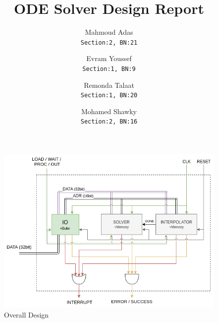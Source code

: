 \documentclass[12pt]{extarticle}
\title{ODE Solver Design Report}
\author{
  Mahmoud Adas\\
  \texttt{Section:2, BN:21}
  \and
  Evram Youssef\\
  \texttt{Section:1, BN:9}
  \and
  Remonda Talaat\\
  \texttt{Section:1, BN:20}
  \and
  Mohamed Shawky\\
  \texttt{Section:2, BN:16}
}
\begin{document}
\maketitle

 \begin{figure}[hp]
    \centering
    \includegraphics[width=\textwidth]{d1}
    \caption{Overall Design}
    \label{fig:overall}
\end{figure}
\end{document}

